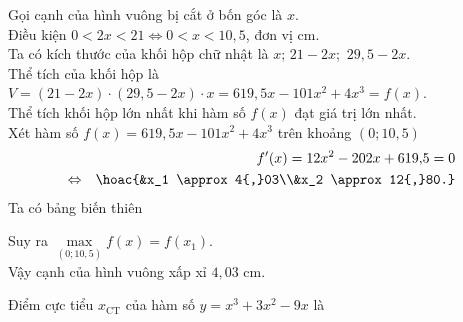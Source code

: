 \begin{ex}
{ Gọi cạnh của hình vuông bị cắt ở bốn góc là $x$.\\
 Điều kiện $0< 2x < 21\Leftrightarrow 0< x < 10,5$, đơn vị cm.\\
 Ta có kích thước của khối hộp chữ nhật là $x$; $21-2x$;\ $29{,}5-2x$.\\
 Thể tích của khối hộp là $V=(21-2x)\cdot (29{,}5-2x)\cdot x=619{,}5x-101x^2+4x^3=f(x)$.\\
 Thể tích khối hộp lớn nhất khi hàm số $f(x)$ đạt giá trị lớn nhất.\\
 Xét hàm số $f(x)=619{,}5x-101x^2+4x^3$ trên khoảng $(0;10{,}5)$
 \begin{eqnarray*}
 &&f'(x)=12x^2-202x+619{,}5=0\\
 &\Leftrightarrow& \hoac{&x_1 \approx 4{,}03\\&x_2 \approx 12{,}80.}
 \end{eqnarray*}
 Ta có bảng biến thiên
 \begin{center}
 \end{center}
 Suy ra $\max\limits_{(0;10{,}5)} f(x)=f(x_1)$.\\
 Vậy cạnh của hình vuông xấp xỉ $4{,}03$ cm.
 }
\end{ex}

\begin{ex}%
 Điểm cực tiểu $x_{\text{CT}}$ của hàm số $y=x^3+3x^2-9x$ là
\end{ex}

